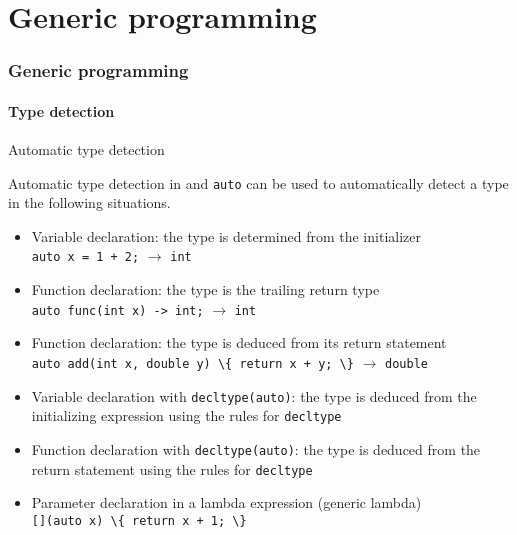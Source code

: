 \part{Generic programming}

\section{Generic programming}

\subsection{Type detection}

\begin{frame}{Automatic type detection}{}
  \begin{block}{Automatic type detection in  and }
    \lstinline!auto! can be used to automatically detect a type in the following situations.
    \begin{itemize}
    \item
      Variable declaration: the type is determined from the initializer \\
      \lstinline!auto x = 1 + 2;! $\to$ \lstinline!int!
    \item
      Function declaration: the type is the trailing return type \\
      \lstinline!auto func(int x) -> int;! $\to$ \lstinline!int!
    \item
      Function declaration: the type is deduced from its return statement \\
      \lstinline!auto add(int x, double y) \{ return x + y; \}! $\to$ \lstinline!double!
    \item
      Variable declaration with \lstinline!decltype(auto)!: the type is deduced from the initializing expression using the rules for \lstinline!decltype!
    \item
      Function declaration with \lstinline!decltype(auto)!: the type is deduced from the return statement using the rules for \lstinline!decltype!
    \item
      Parameter declaration in a lambda expression (generic lambda) \\
      \lstinline![](auto x) \{ return x + 1; \}!
    \end{itemize}
  \end{block}
\end{frame}

